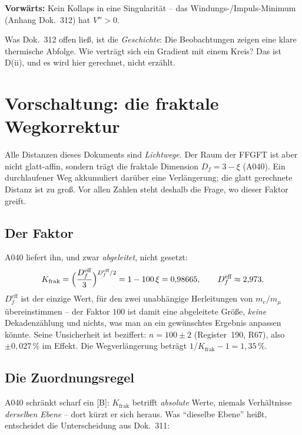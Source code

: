 \documentclass[11pt]{report}
\begin{document}
\textbf{Vorwärts:} Kein Kollaps in eine Singularität -- das
Windungs-/Impuls-Minimum (Anhang Dok.~312) hat $V'' > 0$.

Was Dok.~312 offen ließ, ist die \emph{Geschichte}: Die
Beobachtungen zeigen eine klare thermische Abfolge. Wie verträgt
sich ein Gradient mit einem Kreis? Das ist D(ii), und es wird hier
gerechnet, nicht erzählt.

\chapter{Vorschaltung: die fraktale Wegkorrektur}

Alle Distanzen dieses Dokuments sind \emph{Lichtwege}. Der Raum
der FFGFT ist aber nicht glatt-affin, sondern trägt die fraktale
Dimension $D_f = 3-\xi$ (A040). Ein durchlaufener Weg akkumuliert
darüber eine Verlängerung; die glatt gerechnete Distanz ist zu
groß. Vor allen Zahlen steht deshalb die Frage, wo dieser Faktor
greift.

\section{Der Faktor}

A040 liefert ihn, und zwar \emph{abgeleitet}, nicht gesetzt:
\begin{equation}
  K_\text{frak} = \Bigl(\frac{D_f^\text{eff}}{3}\Bigr)^{D_f^\text{eff}/2}
  = 1-100\,\xi = 0{,}98665,
  \qquad D_f^\text{eff} \approx 2{,}973 .
\end{equation}
$D_f^\text{eff}$ ist der einzige Wert, für den zwei unabhängige
Herleitungen von $m_e/m_\mu$ übereinstimmen -- der Faktor $100$
ist damit eine abgeleitete Größe, \emph{keine} Dekadenzählung und
nichts, was man an ein gewünschtes Ergebnis anpassen könnte. Seine
Unsicherheit ist beziffert: $n = 100 \pm 2$ (Register~190, R67),
also $\pm 0{,}027\,\%$ im Effekt. Die Wegverlängerung beträgt
$1/K_\text{frak} - 1 = 1{,}35\,\%$.

\section{Die Zuordnungsregel}

A040 schränkt scharf ein [B]: $K_\text{frak}$ betrifft
\emph{absolute} Werte, niemals Verhältnisse \emph{derselben
Ebene} -- dort kürzt er sich heraus. Was \enquote{dieselbe Ebene}
heißt, entscheidet die Unterscheidung aus Dok.~311:
\end{document}
